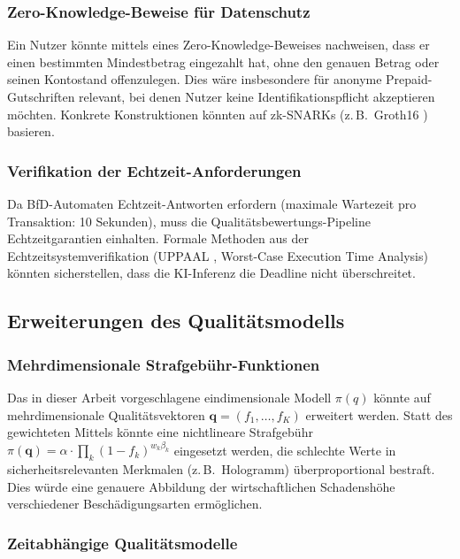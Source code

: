 ﻿\documentclass[a4paper,12pt]{article}
\theoremstyle{definition}
\begin{document}
\subsubsection{Zero-Knowledge-Beweise für Datenschutz}

Ein Nutzer könnte mittels eines Zero-Knowledge-Beweises \cite{goldwasser1989knowledge}
nachweisen, dass er einen bestimmten Mindestbetrag eingezahlt hat, ohne den
genauen Betrag oder seinen Kontostand offenzulegen.
Dies wäre insbesondere für anonyme Prepaid-Gutschriften relevant,
bei denen Nutzer keine Identifikationspflicht akzeptieren möchten.
Konkrete Konstruktionen könnten auf zk-SNARKs (z.\,B.\ Groth16 \cite{groth2016}) basieren.

\subsubsection{Verifikation der Echtzeit-Anforderungen}

Da BfD-Automaten Echtzeit-Antworten erfordern (maximale Wartezeit pro Transaktion:
10 Sekunden), muss die Qualitätsbewertungs-Pipeline Echtzeitgarantien einhalten.
Formale Methoden aus der Echtzeitsystemverifikation (UPPAAL \cite{behrmann2004uppaal},
Worst-Case Execution Time Analysis) könnten sicherstellen, dass die KI-Inferenz
die Deadline nicht überschreitet.

\subsection{Erweiterungen des Qualitätsmodells}

\subsubsection{Mehrdimensionale Strafgebühr-Funktionen}

Das in dieser Arbeit vorgeschlagene eindimensionale Modell $\pi(q)$ könnte
auf mehrdimensionale Qualitätsvektoren $\mathbf{q} = (f_1,\ldots,f_K)$ erweitert werden.
Statt des gewichteten Mittels könnte eine nichtlineare Strafgebühr
$\pi(\mathbf{q}) = \alpha \cdot \prod_k (1-f_k)^{w_k \beta_k}$ eingesetzt werden,
die schlechte Werte in sicherheitsrelevanten Merkmalen (z.\,B.\ Hologramm) überproportional
bestraft.  Dies würde eine genauere Abbildung der wirtschaftlichen Schadenshöhe
verschiedener Beschädigungsarten ermöglichen.

\subsubsection{Zeitabhängige Qualitätsmodelle}
\end{document}
